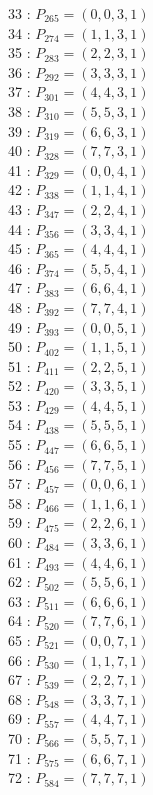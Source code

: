 \documentclass{article}
\begin{document}
{\begin{multicols}{3}
33 : $P_{265}=( 0, 0, 3, 1 )$\\
34 : $P_{274}=( 1, 1, 3, 1 )$\\
35 : $P_{283}=( 2, 2, 3, 1 )$\\
36 : $P_{292}=( 3, 3, 3, 1 )$\\
37 : $P_{301}=( 4, 4, 3, 1 )$\\
38 : $P_{310}=( 5, 5, 3, 1 )$\\
39 : $P_{319}=( 6, 6, 3, 1 )$\\
40 : $P_{328}=( 7, 7, 3, 1 )$\\
41 : $P_{329}=( 0, 0, 4, 1 )$\\
42 : $P_{338}=( 1, 1, 4, 1 )$\\
43 : $P_{347}=( 2, 2, 4, 1 )$\\
44 : $P_{356}=( 3, 3, 4, 1 )$\\
45 : $P_{365}=( 4, 4, 4, 1 )$\\
46 : $P_{374}=( 5, 5, 4, 1 )$\\
47 : $P_{383}=( 6, 6, 4, 1 )$\\
48 : $P_{392}=( 7, 7, 4, 1 )$\\
49 : $P_{393}=( 0, 0, 5, 1 )$\\
50 : $P_{402}=( 1, 1, 5, 1 )$\\
51 : $P_{411}=( 2, 2, 5, 1 )$\\
52 : $P_{420}=( 3, 3, 5, 1 )$\\
53 : $P_{429}=( 4, 4, 5, 1 )$\\
54 : $P_{438}=( 5, 5, 5, 1 )$\\
55 : $P_{447}=( 6, 6, 5, 1 )$\\
56 : $P_{456}=( 7, 7, 5, 1 )$\\
57 : $P_{457}=( 0, 0, 6, 1 )$\\
58 : $P_{466}=( 1, 1, 6, 1 )$\\
59 : $P_{475}=( 2, 2, 6, 1 )$\\
60 : $P_{484}=( 3, 3, 6, 1 )$\\
61 : $P_{493}=( 4, 4, 6, 1 )$\\
62 : $P_{502}=( 5, 5, 6, 1 )$\\
63 : $P_{511}=( 6, 6, 6, 1 )$\\
64 : $P_{520}=( 7, 7, 6, 1 )$\\
65 : $P_{521}=( 0, 0, 7, 1 )$\\
66 : $P_{530}=( 1, 1, 7, 1 )$\\
67 : $P_{539}=( 2, 2, 7, 1 )$\\
68 : $P_{548}=( 3, 3, 7, 1 )$\\
69 : $P_{557}=( 4, 4, 7, 1 )$\\
70 : $P_{566}=( 5, 5, 7, 1 )$\\
71 : $P_{575}=( 6, 6, 7, 1 )$\\
72 : $P_{584}=( 7, 7, 7, 1 )$\\
\end{multicols}


}
\end{document}

